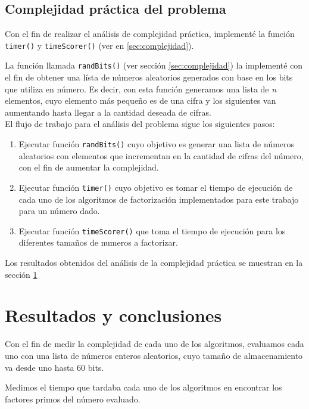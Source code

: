 \documentclass{article}
\begin{document}
\subsection{Complejidad práctica del problema}

Con el fin de realizar el análisis de complejidad práctica, implementé la
función \texttt{timer()} y \texttt{timeScorer()} (ver en \ref{sec:complejidad}).

La función llamada \texttt{randBits()} (ver sección \ref{sec:complejidad}) la
implementé con el fin de obtener una lísta de números aleatorios generados con
base en los bits que utiliza en número. Es decir, con esta función generamos una
lista de \textit{n} elementos, cuyo elemento más pequeño es de una cifra y los
siguientes van aumentando hasta llegar a la cantidad deseada de cifras.\\

El flujo de trabajo para el análisis del problema sigue los siguientes pasos:

\begin{enumerate}

\item Ejecutar función \texttt{randBits()} cuyo objetivo es generar una lista de
números aleatorios con elementos que incrementan en la cantidad de cifras del
número, con el fin de aumentar la complejidad.
\item Ejecutar función \texttt{timer()} cuyo objetivo es tomar el tiempo de
ejecución de cada uno de los algoritmos de factorización implementados para este
trabajo para un número dado.
\item Ejecutar función \texttt{timeScorer()} que toma el tiempo de ejecución
para los diferentes tamaños de numeros a factorizar.
\end{enumerate}
    

Los resultados obtenidos del análisis de la complejidad práctica se muestran en
la sección \ref{sec:resultados}


\section{Resultados y conclusiones} \label{sec:resultados}

Con el fin de medir la complejidad de cada uno de los algoritmos, evaluamos cada
uno con una lista de números enteros aleatorios, cuyo tamaño de almacenamiento
va desde uno hasta 60 bits.

Medimos el tiempo que tardaba cada uno de los algoritmos en encontrar los
factores primos del número evaluado.
\end{document}
